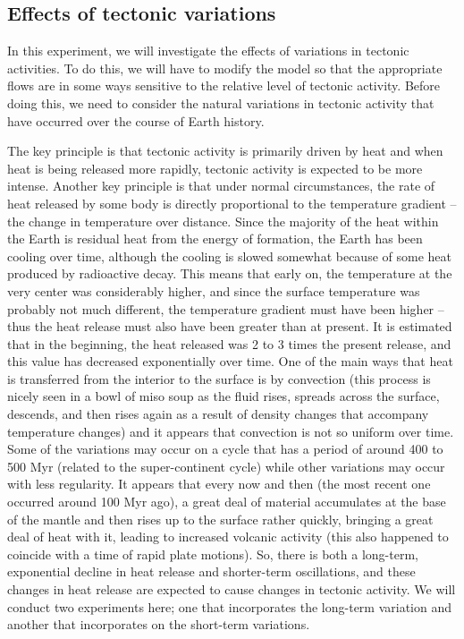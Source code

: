\documentclass[11pt,letterpaper]{article}
\begin{document}
\subsection{Effects of tectonic variations}
In this experiment, we will investigate the effects of variations in tectonic activities. To do this, we will have to modify the model so that the appropriate flows are in some ways sensitive to the relative level of tectonic activity. Before doing this, we need to consider the natural variations in tectonic activity that have occurred over the course of Earth history. 

The key principle is that tectonic activity is primarily driven by heat and when heat is being released more rapidly, tectonic activity is expected to be more intense. Another key principle is that under normal circumstances, the rate of heat released by some body is directly proportional to the temperature gradient -- the change in temperature over distance. Since the majority of the heat within the Earth is residual heat from the energy of formation, the Earth has been cooling over time, although the cooling is slowed somewhat because of some heat produced by radioactive decay. This means that early on, the temperature at the very center was considerably higher, and since the surface temperature was probably not much different, the temperature gradient must have been higher -- thus the heat release must also have been greater than at present. It is estimated that in the beginning, the heat released was 2 to 3 times the present release, and this value has decreased exponentially over time. One of the main ways that heat is transferred from the interior to the surface is by convection (this process is nicely seen in a bowl of miso soup as the fluid rises, spreads across the surface, descends, and then rises again as a result of density changes that accompany temperature changes) and it appears that convection is not so uniform over time. Some of the variations may occur on a cycle that has a period of around 400 to 500 Myr (related to the super-continent cycle) while other variations may occur with less regularity. It appears that every now and then (the most recent one occurred around 100 Myr ago), a great deal of material accumulates at the base of the mantle and then rises up to the surface rather quickly, bringing a great deal of heat with it, leading to increased volcanic activity (this also happened to coincide with a time of rapid plate motions). So, there is both a long-term, exponential decline in heat release and shorter-term oscillations, and these changes in heat release are expected to cause changes in tectonic activity. We will conduct two experiments here; one that incorporates the long-term variation and another that incorporates on the short-term variations.
\bigskip
\end{document}
